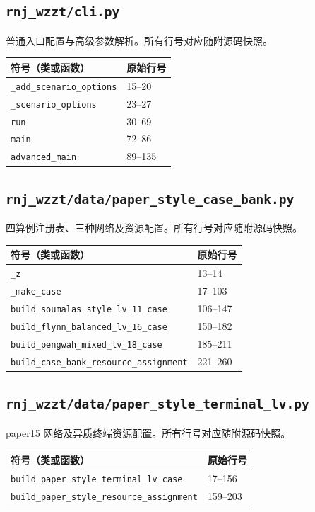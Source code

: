 \subsection{\texorpdfstring{\nolinkurl{rnj_wzzt/cli.py}}{rnj\_wzzt/cli.py}}\label{module:cli}
普通入口配置与高级参数解析。所有行号对应随附源码快照。
\begin{longtable}{P{0.73\textwidth}P{0.18\textwidth}}\toprule 符号（类或函数） & 原始行号\\\midrule\endhead
\nolinkurl{_add_scenario_options} & 15--20 \\
\nolinkurl{_scenario_options} & 23--27 \\
\nolinkurl{run} & 30--69 \\
\nolinkurl{main} & 72--86 \\
\nolinkurl{advanced_main} & 89--135 \\
\bottomrule\end{longtable}
\subsection{\texorpdfstring{\nolinkurl{rnj_wzzt/data/paper_style_case_bank.py}}{rnj\_wzzt/data/paper\_style\_case\_bank.py}}\label{module:data.paper_style_case_bank}
四算例注册表、三种网络及资源配置。所有行号对应随附源码快照。
\begin{longtable}{P{0.73\textwidth}P{0.18\textwidth}}\toprule 符号（类或函数） & 原始行号\\\midrule\endhead
\nolinkurl{_z} & 13--14 \\
\nolinkurl{_make_case} & 17--103 \\
\nolinkurl{build_soumalas_style_lv_11_case} & 106--147 \\
\nolinkurl{build_flynn_balanced_lv_16_case} & 150--182 \\
\nolinkurl{build_pengwah_mixed_lv_18_case} & 185--211 \\
\nolinkurl{build_case_bank_resource_assignment} & 221--260 \\
\bottomrule\end{longtable}
\subsection{\texorpdfstring{\nolinkurl{rnj_wzzt/data/paper_style_terminal_lv.py}}{rnj\_wzzt/data/paper\_style\_terminal\_lv.py}}\label{module:data.paper_style_terminal_lv}
paper15 网络及异质终端资源配置。所有行号对应随附源码快照。
\begin{longtable}{P{0.73\textwidth}P{0.18\textwidth}}\toprule 符号（类或函数） & 原始行号\\\midrule\endhead
\nolinkurl{build_paper_style_terminal_lv_case} & 17--156 \\
\nolinkurl{build_paper_style_resource_assignment} & 159--203 \\
\bottomrule\end{longtable}
